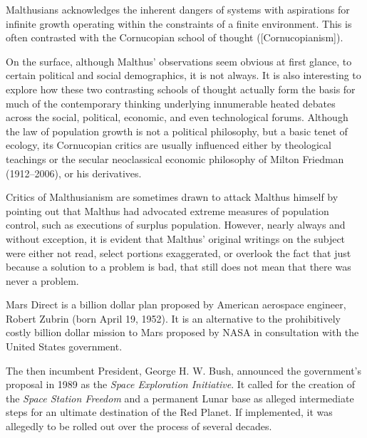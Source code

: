     {}

Malthusians acknowledges the inherent dangers of systems with aspirations for infinite growth operating within the constraints of a finite environment. This is often contrasted with the Cornucopian school of thought ([Cornucopianism]). 

On the surface, although Malthus' observations seem obvious at first glance, to certain political and social demographics, it is not always. It is also interesting to explore how these two contrasting schools of thought actually form the basis for much of the contemporary thinking underlying innumerable heated debates across the social, political, economic, and even technological forums. Although the law of population growth is not a political philosophy, but a basic tenet of ecology, its Cornucopian critics are usually influenced either by theological teachings or the secular neoclassical economic philosophy of Milton Friedman (1912--2006), or his derivatives.

Critics of Malthusianism are sometimes drawn to attack Malthus himself by pointing out that Malthus had advocated extreme measures of population control, such as executions of surplus population. However, nearly always and without exception, it is evident that Malthus' original writings on the subject were either not read, select portions exaggerated, or overlook the fact that just because a solution to a problem is bad, that still does not mean that there was never a problem.

Mars Direct is a  billion dollar plan proposed by American aerospace engineer, Robert Zubrin (born April 19, 1952). It is an alternative to the prohibitively costly  billion dollar mission to Mars proposed by NASA in consultation with the United States government.

The then incumbent President, George H. W. Bush, announced the government's proposal in 1989 as the {\it Space Exploration Initiative}. It called for the creation of the {\it Space Station Freedom} and a permanent Lunar base as alleged intermediate steps for an ultimate destination of the Red Planet. If implemented, it was allegedly to be rolled out over the process of several decades.

